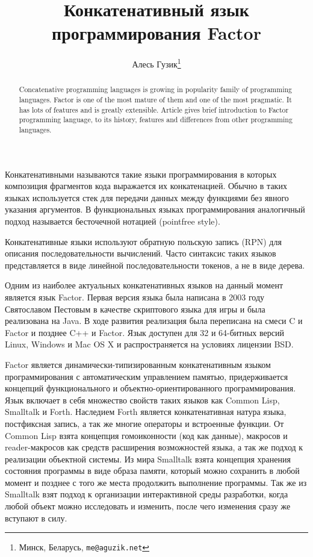 \documentclass[a5paper,10pt]{article}
\begin{document}
\title{Конкатенативный язык программирования Factor}

\author{Алесь Гузик\footnote{Минск, Беларусь, {\tt me@aguzik.net}}}
\date{}
\maketitle


\begin{abstract}
  Concatenative programming languages is growing in popularity family
  of programming languages. Factor is one of the most mature of them
  and one of the most pragmatic. It has lots of features and is
  greatly extensible. Article gives brief introduction to Factor
  programming language, to its history, features and differences from
  other programming languages.
\end{abstract}

Конкатенативными называются такие языки программирования в которых
композиция фрагментов кода выражается их конкатенацией. Обычно в
таких языках используется стек для передачи данных между функциями без
явного указания аргументов. В функциональных языках программирования
аналогичный подход называется бесточечной нотацией (pointfree style).

Конкатенативные языки используют обратную польскую запись (RPN) для
описания последовательности вычислений. Часто синтаксис таких языков
представляется в виде линейной последовательности токенов, а не в виде
дерева.

Одним из наиболее актуальных конкатенативных языков на данный момент
является язык Factor. Первая версия языка была написана в 2003 году
Святославом Пестовым в качестве скриптового языка для игры и была
реализована на Java. В ходе развития реализация была переписана на
смеси C и Factor и позднее C++ и Factor. Язык доступен для 32 и
64-битных версий Linux, Windows и Mac OS X и распространяется на
условиях лицензии BSD.

Factor является динамически-типизированным конкатенативным языком
программирования с автоматическим управлением памятью, придерживается
концепций функционального и объектно-ориентированного
программирования. Язык включает в себя множество свойств таких языков
как Common Lisp, Smalltalk и Forth. Наследием Forth является
конкатенативная натура языка, постфиксная запись, а так же многие
операторы и встроенные функции. От Common Lisp взята концепция
гомоиконности (код как данные), макросов и reader-макросов как средств
расширения возможностей языка, а так же подход к реализации объектной
системы. Из мира Smalltalk взята концепция хранения состояния
программы в виде образа памяти, который можно сохранить в любой момент
и позднее с того же места продолжить выполнение программы. Так же из
Smalltalk взят подход к организации интерактивной среды разработки,
когда любой объект можно исследовать и изменить, после чего изменения
сразу же вступают в силу.
\end{document}

